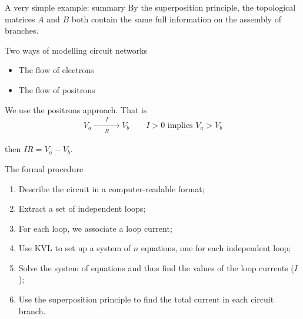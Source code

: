 \documentclass[xcolor=dvipsnames]{beamer}
\begin{document}
\begin{frame}{A very simple example: summary}
	By the superposition principle, the topological matrices $A$ and $B$ both contain the same full information on the assembly of branches.
\end{frame}

\begin{frame}{Two ways of modelling circuit networks}
\begin{itemize}
	\item The flow of electrons
	\item The flow of positrons
\end{itemize}
We use the positrons approach. That is
\begin{align*}
V_a	\xrightarrow[R]{\qquad I \qquad} V_b \qquad I>0\,\,\text{implies}\,\,V_a>V_b
\end{align*}
	
\end{frame}
then $IR=V_a-V_b.$
\begin{frame}{The formal procedure}
\begin{enumerate}
	\item Describe the circuit in a computer-readable format;
	\item Extract a set of independent loops;
	\item For each loop, we associate a loop current;
	\item Use KVL to set up a system of $n$ equations, one for each independent loop;
	\item Solve the system of equations and thus find the values of the loop currents ($I$);
	\item Use the superposition principle to find the total current in each circuit branch.
\end{enumerate}
\end{frame}
\end{document}
